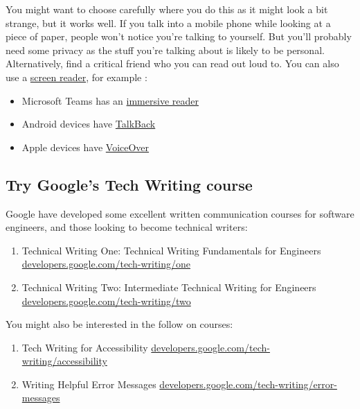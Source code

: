 \documentclass[
]{book}
\providecommand{\tightlist}{%
  \setlength{\itemsep}{0pt}\setlength{\parskip}{0pt}}
\begin{document}
You might want to choose carefully where you do this as it might look a bit strange, but it works well. If you talk into a mobile phone while looking at a piece of paper, people won't notice you're talking to yourself. But you'll probably need some privacy as the stuff you're talking about is likely to be personal. Alternatively, find a critical friend who you can read out loud to. You can also use a \href{https://en.wikipedia.org/wiki/Screen_reader}{screen reader}, for example :

\begin{itemize}
\tightlist
\item
  Microsoft Teams has an \href{https://www.microsoft.com/en-gb/education/products/learning-tools}{immersive reader}
\item
  Android devices have \href{https://support.google.com/accessibility/android/answer/6007100}{TalkBack}
\item
  Apple devices have \href{https://support.apple.com/en-gb/guide/iphone/iph3e2e415f/ios}{VoiceOver}
\end{itemize}

\hypertarget{techwriting}{%
\subsection{Try Google's Tech Writing course}\label{techwriting}}

Google have developed some excellent written communication courses for software engineers, and those looking to become technical writers:

\begin{enumerate}
\def\labelenumi{\arabic{enumi}.}
\tightlist
\item
  Technical Writing One: Technical Writing Fundamentals for Engineers \href{https://developers.google.com/tech-writing/one}{developers.google.com/tech-writing/one}
\item
  Technical Writing Two: Intermediate Technical Writing for Engineers \href{https://developers.google.com/tech-writing/two}{developers.google.com/tech-writing/two}
\end{enumerate}

You might also be interested in the follow on courses:

\begin{enumerate}
\def\labelenumi{\arabic{enumi}.}
\tightlist
\item
  Tech Writing for Accessibility \href{https://developers.google.com/tech-writing/accessibility}{developers.google.com/tech-writing/accessibility}
\item
  Writing Helpful Error Messages \href{https://developers.google.com/tech-writing/error-messages}{developers.google.com/tech-writing/error-messages}
\end{enumerate}
\end{document}
